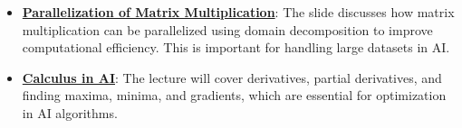 \documentclass{article}%
\begin{document}
\begin{itemize}[leftmargin=*]
\item \href{https://purdue.brightspace.com/d2l/common/assets/pdfjs-d2l-dist/1.0.14-legacy/web/viewer.html?file=\%2Fcontent\%2Fenforced\%2F1095467-wl.202510.CS.24300.001\%2F04L1-Linear Algebra Primer.pdf\%3Fou\%3D1095467\&lang=en-us\&container=d2l-fileviewer-rendered-pdf\&fullscreen=d2l-fileviewer-rendered-pdf-dialog\&height=667#page=18}{\textbf{Parallelization of Matrix Multiplication}}: The slide discusses how matrix multiplication can be parallelized using domain decomposition to improve computational efficiency. This is important for handling large datasets in AI.%
\item \href{https://purdue.brightspace.com/d2l/common/assets/pdfjs-d2l-dist/1.0.14-legacy/web/viewer.html?file=\%2Fcontent\%2Fenforced\%2F1095467-wl.202510.CS.24300.001\%2F04L1-Linear Algebra Primer.pdf\%3Fou\%3D1095467\&lang=en-us\&container=d2l-fileviewer-rendered-pdf\&fullscreen=d2l-fileviewer-rendered-pdf-dialog\&height=667#page=19}{\textbf{Calculus in AI}}: The lecture will cover derivatives, partial derivatives, and finding maxima, minima, and gradients, which are essential for optimization in AI algorithms.%
\end{itemize}%
\end{document}
